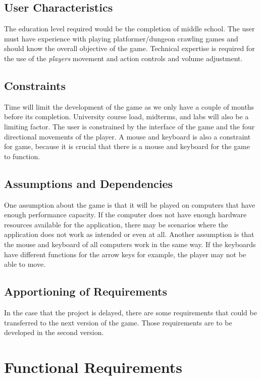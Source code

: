\documentclass[12pt, titlepage]{article}
\begin{document}
  \subsection{User Characteristics}
  The education level required would be the completion of middle school. The user must have experience with playing platformer/dungeon crawling games and should know the overall objective of the game. Technical expertise is required for the use of the \textit{players} movement and action controls and volume adjustment.
  \subsection{Constraints}
  Time will limit the development of the game as we only have a couple of months before its completion. University course load, midterms, and labs will also be a limiting factor. The user is constrained by the interface of the game and the four directional movements of the player. A mouse and keyboard is also a constraint for game, because it is crucial that there is a mouse and keyboard for the game to function. 
  \subsection{Assumptions and Dependencies}
  One assumption about the game is that it will be played on computers that have enough performance capacity. If the computer does not have enough hardware resources available for the application, there may be scenarios where the application does not work as intended or even at all. Another assumption is that the mouse and keyboard of all computers work in the same way. If the keyboards have different functions for the arrow keys for example, the player may not be able to move.
  \subsection{Apportioning of Requirements}
  In the case that the project is delayed, there are some requirements that could be transferred to the next version of the game. Those requirements are to be developed in the second version.

\section{Functional Requirements}
\end{document}
